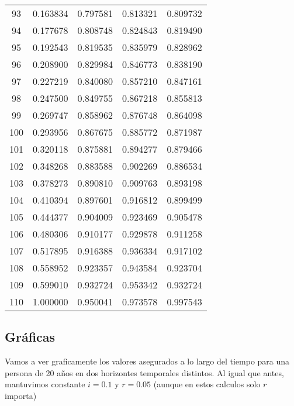\begin{center}
\begin{tabular}{|c|c|c|c|c|}
    93    & 0.163834   & 0.797581     & 0.813321     & 0.809732 \\ 
    94    & 0.177678   & 0.808748     & 0.824843     & 0.819490 \\ 
    95    & 0.192543   & 0.819535     & 0.835979     & 0.828962 \\ 
    96    & 0.208900   & 0.829984     & 0.846773     & 0.838190 \\ 
    97    & 0.227219   & 0.840080     & 0.857210     & 0.847161 \\ 
    98    & 0.247500   & 0.849755     & 0.867218     & 0.855813 \\ 
    99    & 0.269747   & 0.858962     & 0.876748     & 0.864098 \\ 
    100   & 0.293956   & 0.867675     & 0.885772     & 0.871987 \\ 
    101   & 0.320118   & 0.875881     & 0.894277     & 0.879466 \\ 
    102   & 0.348268   & 0.883588     & 0.902269     & 0.886534 \\ 
    103   & 0.378273   & 0.890810     & 0.909763     & 0.893198 \\ 
    104   & 0.410394   & 0.897601     & 0.916812     & 0.899499 \\ 
    105   & 0.444377   & 0.904009     & 0.923469     & 0.905478 \\ 
    106   & 0.480306   & 0.910177     & 0.929878     & 0.911258 \\ 
    107   & 0.517895   & 0.916388     & 0.936334     & 0.917102 \\ 
    108   & 0.558952   & 0.923357     & 0.943584     & 0.923704 \\ 
    109   & 0.599010   & 0.932724     & 0.953342     & 0.932724 \\ 
    110   & 1.000000   & 0.950041     & 0.973578     & 0.997543 \\
    \hline
\end{tabular}
\end{center} 

\subsection{Gráficas}

Vamos a ver graficamente los valores asegurados a lo largo del tiempo para una persona de 20 años en dos horizontes temporales distintos. Al igual que antes, mantuvimos constante $i=0.1$ y $r = 0.05$ (aunque en estos calculos solo $r$ importa)

